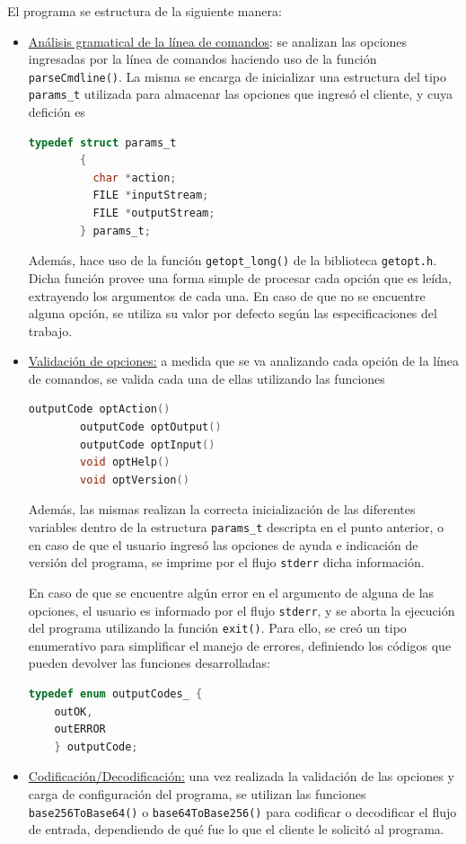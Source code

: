 El programa se estructura de la siguiente manera:
\begin{itemize}
	\item \underline{Análisis gramatical de la línea de comandos}: se analizan las opciones ingresadas por la línea de comandos haciendo uso de la función \texttt{parseCmdline()}. La misma se encarga de inicializar una estructura del tipo \texttt{params\_t} utilizada para almacenar las opciones que ingresó el cliente, y cuya defición es
	\begin{lstlisting}[language=C, style=StyleC]
    	typedef struct params_t
        {
          char *action;
          FILE *inputStream;
          FILE *outputStream;
        } params_t;
	\end{lstlisting}
	Además, hace uso de la función \texttt{getopt\_long()} de la biblioteca \texttt{getopt.h}. Dicha función provee una forma simple de procesar cada opción que es leída, extrayendo los argumentos de cada una. En caso de que no se encuentre alguna opción, se utiliza su valor por defecto según las especificaciones del trabajo.

	\item \underline{Validación de opciones:} a medida que se va analizando cada opción de la línea de comandos, se valida cada una de ellas utilizando las funciones 
	\begin{lstlisting}[language=C, style=StyleC]
    	outputCode optAction()
        outputCode optOutput()
        outputCode optInput()
        void optHelp()
        void optVersion()
    \end{lstlisting}
    Además, las mismas realizan la correcta inicialización de las diferentes variables dentro de la estructura \texttt{params\_t} descripta en el punto anterior, o en caso de que el usuario ingresó las opciones de ayuda e indicación de versión del programa, se imprime por el flujo \texttt{stderr} dicha información.
    
	En caso de que se encuentre algún error en el argumento de alguna de las opciones, el usuario es informado por el flujo \texttt{stderr}, y se aborta la ejecución del programa utilizando la función \texttt{exit()}. Para ello, se creó un tipo enumerativo para simplificar el manejo de errores, definiendo los códigos que pueden devolver las funciones desarrolladas:
	\begin{lstlisting}[language=C, style=StyleC]
	typedef enum outputCodes_ {
	outOK,
	outERROR
	} outputCode;
	\end{lstlisting}
	
	\item \underline{Codificación/Decodificación:} una vez realizada la validación de las opciones y carga de configuración del programa, se utilizan las funciones \texttt{base256ToBase64()} o \texttt{base64ToBase256()} para codificar o decodificar el flujo de entrada, dependiendo de qué fue lo que el cliente le solicitó al programa.
	

\end{itemize}
